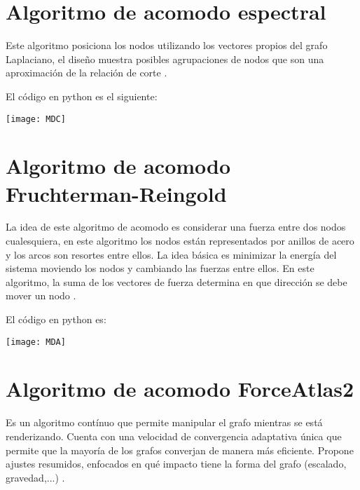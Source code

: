 \documentclass[10pt,a4paper]{article}
\begin{document}
\section{Algoritmo de acomodo espectral}

Este algoritmo posiciona los nodos utilizando los vectores propios del grafo Laplaciano, el diseño muestra posibles agrupaciones de nodos que son una aproximación de la relación de corte \cite{j}.\vspace{.4cm}

El código en python es el siguiente:



\begin{center}

\texttt{[image: MDC]}

\end{center}

\section{Algoritmo de acomodo Fruchterman-Reingold}

La idea de este algoritmo de acomodo es considerar una fuerza entre dos nodos cualesquiera, en este algoritmo los nodos están representados por anillos de acero y los arcos son resortes entre ellos. La idea básica es minimizar la energía del sistema moviendo los nodos y cambiando las fuerzas entre ellos. En este algoritmo, la suma de los vectores de fuerza determina en que dirección se debe mover un nodo \cite{k}.\newpage

El código en python es:



\begin{center}

\texttt{[image: MDA]}

\end{center}

\section{Algoritmo de acomodo ForceAtlas2}

Es un algoritmo contínuo que permite manipular el grafo mientras se está renderizando. Cuenta con una velocidad de convergencia adaptativa única que permite que la mayoría de los grafos converjan de manera más eficiente. Propone ajustes resumidos, enfocados en qué impacto tiene la forma del grafo (escalado, gravedad,...) \cite{l}.\newpage
\end{document}
